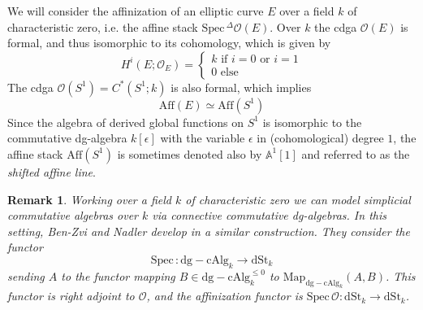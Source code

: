 \documentclass[11pt,letterpaper]{amsart}
\newtheorem{remark}[dummy]{Remark}
\newcommand{\bA}{\mathbb{A}}
\newcommand{\cO}{\mathcal{O}}
\newcommand{\dSt}{\mathrm{dSt}}
\newcommand{\Aff}[1]{\mathrm{Aff}(#1)}
\newcommand{\Spec}{\mathrm{S}\mathrm{pec}\,}
\begin{document}
 
We will consider the affinization of an elliptic curve $E$ over a field $k$ of characteristic zero, i.e. the affine stack $\Spec^{\Delta}\cO(E)$. Over $k$ the cdga $\cO(E)$ is formal, and thus isomorphic to its cohomology, which is given by 
\begin{equation*}
H^i(E;\cO_E)=
\begin{cases}
k\mbox{ if $i=0$ or $i=1$}\\
0\mbox{ else}
\end{cases}
\end{equation*}
The cdga $\cO(S^1)=C^\ast(S^1;k)$ is also formal, which implies 
\begin{equation*}
\Aff{E}\simeq\Aff{S^1}
\end{equation*}
Since the algebra of derived global functions on $S^1$ is isomorphic to the commutative dg-algebra $k[\epsilon]$ with the variable $\epsilon$ in (cohomological) degree $1$, the affine stack $\Aff{S^1}$ is sometimes denoted also by $\bA^1[1]$ and referred to as the \emph{shifted affine line}. 

\begin{remark}
Working over a field $k$ of characteristic zero we can model simplicial commutative algebras over $k$ via connective commutative dg-algebras. In this setting, Ben-Zvi and Nadler develop in \cite{BZNLoopConn} a similar construction. They consider the functor
\begin{equation*}
\Spec:\mathrm{dg-cAlg}_{k}\rightarrow\dSt_k
\end{equation*}
sending $A$ to the functor  mapping $B\in\mathrm{dg-cAlg}_{k}^{\le 0}$ to $\mathrm{Map}_{\mathrm{dg-cAlg}_{k}}(A,B)$. This functor is right adjoint to $\cO$, and the affinization functor is $\Spec\cO:\dSt_k\rightarrow\dSt_k$.  
\end{remark}
\end{document}
